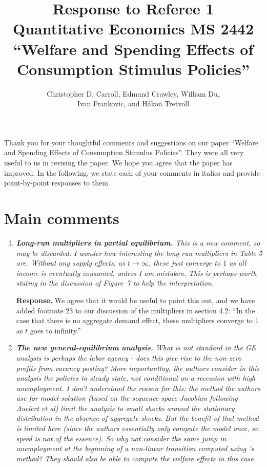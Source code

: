 \documentclass[12pt,letterpaper,english]{article}
\title{\textbf{Response to Referee 1\\ Quantitative Economics MS 2442 \\``Welfare and Spending Effects of \\ Consumption Stimulus Policies''}}
\author{Christopher D. Carroll, Edmund Crawley, William Du, \\ Ivan Frankovic, and H\aa kon Tretvoll}
\date{}
\begin{document}
	\onehalfspacing
	\maketitle
	
\noindent Thank you for your thoughtful comments and suggestions on our paper ``Welfare and Spending Effects of Consumption Stimulus Policies''. They were all very useful to us in revising the paper. We hope you agree that the paper has improved. In the following, we state each of your comments in italics and provide point-by-point responses to them.


\section*{Main comments}
\begin{enumerate}[label=(\alph*)]
	\item \textit{\textbf{Long-run multipliers in partial equilibrium.} This is a new comment, so
		may be discarded: I wonder how interesting the long-run multipliers	in Table 5 are. Without any supply effects, as $t \rightarrow \infty$, these just converge to $1$ as all income is eventually consumed, unless I am mistaken. This is perhaps worth stating in the discussion of Figure~7 to help the interpretation.}
	
	\noindent \textbf{Response.} We agree that it would be useful to point this out, and we have added footnote 23 to our discussion of the multipliers in section 4.2: ``In the case that there is no aggregate demand effect, these multipliers converge to 1 as $t$ goes to infinity.''
	
	\item \textit{\textbf{The new general-equilibrium analysis.} What is not standard in the GE analysis is perhaps the labor agency - does this give rise to the non-zero profits from vacancy posting? More importantluy, the authors consider in this analysis the policies in steady state, not conditional	on a recession with high unemployment. I don't understand the reason for this: the method the authors use for model-solution (based on the sequence-space Jacobian following Auclert et al) limit the analysis to small shocks around the stationary distribution in the absence of aggregate shocks. But the benefit of that method is	limited here (since the authors essentially only compute the model once, so speed is not of the essence). So why not consider the same jump in unemployment at the beginning of a non-linear transition computed using \citet{bmpMITshocks}'s method? They should also be able to compute the welfare effects in this case.}
	

\end{enumerate}
\end{document}
